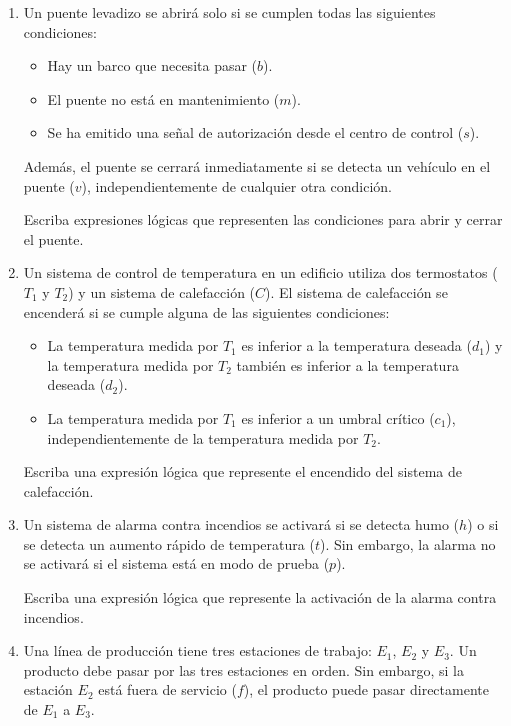 \begin{enumerate}[label=\textbf{\arabic*}.]
	\item Un puente levadizo se abrirá solo si se cumplen todas las siguientes condiciones:
	
	\begin{itemize}[itemsep=-3pt]
		\item Hay un barco que necesita pasar ($b$).
		\item El puente no está en mantenimiento ($m$).
		\item Se ha emitido una señal de autorización desde el centro de control ($s$).
	\end{itemize}	
	Además, el puente se cerrará inmediatamente si se detecta un vehículo en el puente ($v$), independientemente de cualquier otra condición.
	
	Escriba expresiones lógicas que representen las condiciones para abrir y cerrar el puente.
	
	\item Un sistema de control de temperatura en un edificio utiliza dos termostatos ($T_1$ y $T_2$) y un sistema de calefacción ($C$). El sistema de calefacción se encenderá si se cumple alguna de las siguientes condiciones:
	\begin{itemize}[itemsep=-3pt]
		\item La temperatura medida por $T_1$ es inferior a la temperatura deseada ($d_1$) y la temperatura medida por $T_2$ también es inferior a la temperatura deseada ($d_2$).
		\item La temperatura medida por $T_1$ es inferior a un umbral crítico ($c_1$), independientemente de la temperatura medida por $T_2$.
	\end{itemize}	
	Escriba una expresión lógica que represente el encendido del sistema de calefacción.
	
	\item Un sistema de alarma contra incendios se activará si se detecta humo ($h$) o si se detecta un aumento rápido de temperatura ($t$). Sin embargo, la alarma no se activará si el sistema está en modo de prueba ($p$).
	
	Escriba una expresión lógica que represente la activación de la alarma contra incendios.
	
	\item Una línea de producción tiene tres estaciones de trabajo: $E_1$, $E_2$ y $E_3$. Un producto debe pasar por las tres estaciones en orden. Sin embargo, si la estación $E_2$ está fuera de servicio ($f$), el producto puede pasar directamente de $E_1$ a $E_3$.
	

\end{enumerate}
